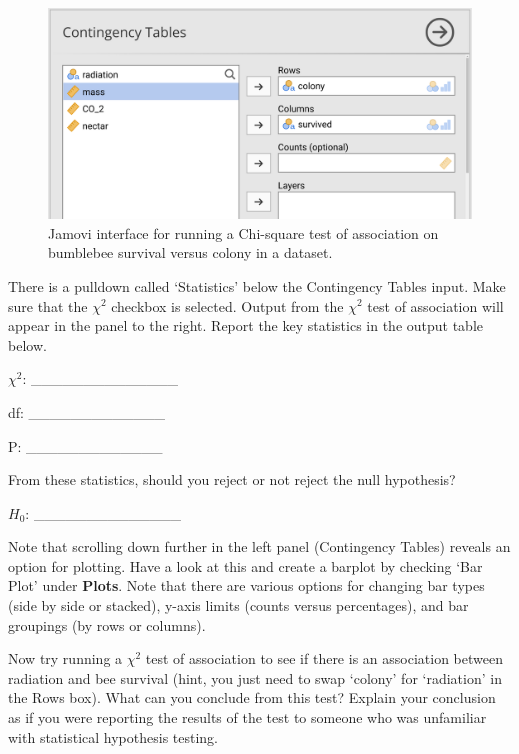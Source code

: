 \documentclass[
  openany]{krantz}
\begin{document}
\begin{figure}
\includegraphics[width=1\linewidth]{img/jamovi_test_of_association_interface} \caption{Jamovi interface for running a Chi-square test of association on bumblebee survival versus colony in a dataset.}\label{fig:unnamed-chunk-133}
\end{figure}

There is a pulldown called `Statistics' below the Contingency Tables input.
Make sure that the \(\chi^{2}\) checkbox is selected.
Output from the \(\chi^{2}\) test of association will appear in the panel to the right.
Report the key statistics in the output table below.

\(\chi^{2}\): \_\_\_\_\_\_\_\_\_\_\_\_\_\_

df: \_\_\_\_\_\_\_\_\_\_\_\_\_

P: \_\_\_\_\_\_\_\_\_\_\_\_\_

From these statistics, should you reject or not reject the null hypothesis?

\(H_{0}\): \_\_\_\_\_\_\_\_\_\_\_\_\_\_

Note that scrolling down further in the left panel (Contingency Tables) reveals an option for plotting.
Have a look at this and create a barplot by checking `Bar Plot' under \textbf{Plots}.
Note that there are various options for changing bar types (side by side or stacked), y-axis limits (counts versus percentages), and bar groupings (by rows or columns).

Now try running a \(\chi^{2}\) test of association to see if there is an association between radiation and bee survival (hint, you just need to swap `colony' for `radiation' in the Rows box).
What can you conclude from this test?
Explain your conclusion as if you were reporting the results of the test to someone who was unfamiliar with statistical hypothesis testing.

\begin{verbatim}



\end{verbatim}
\end{document}
